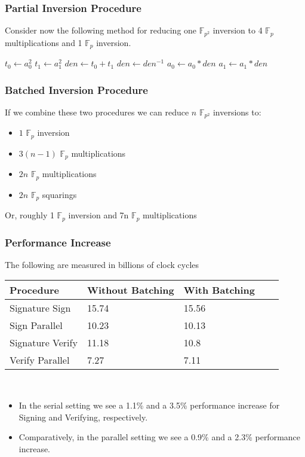 \documentclass{beamer}
\begin{document}
\begin{frame}[fragile]
\frametitle{Partial Inversion Procedure}
Consider now the following method for reducing one $\mathbb{F}_{p^{2}}$ inversion to 4 $\mathbb{F}_{p}$ multiplications and 1 $\mathbb{F}_{p}$ inversion.
\begin{center}
\begin{algorithm}[H]
\begin{algorithmic}[1]
	\State $t_0 \gets a_{0}^{2}$
	\State $t_1 \gets a_{1}^{2}$
	\State $den \gets t_0 + t_1$
	\State $den \gets den^{-1}$
	\State $a_{0} \gets a_{0} * den$
	\State $a_{1} \gets a_{1} * den$
\end{algorithmic}
\end{algorithm}
\end{center}
\end{frame}

\begin{frame}[fragile]
\frametitle{Batched Inversion Procedure}
If we combine these two procedures we can reduce $n$ $\mathbb{F}_{p^{2}}$ inversions to:
\begin{itemize}
\item $1$ $\mathbb{F}_{p}$ inversion
\item $3(n-1)$ $\mathbb{F}_{p}$ multiplications
\item $2n$ $\mathbb{F}_{p}$ multiplications
\item $2n$ $\mathbb{F}_{p}$ squarings
\end{itemize}
Or, roughly 1 $\mathbb{F}_{p}$ inversion and 7n $\mathbb{F}_{p}$ multiplications
\end{frame}

\begin{frame}[fragile]
\frametitle{Performance Increase}
The following are measured in billions of clock cycles
\begin{center}
\begin{tabular}{@{}lllll@{}}
	\toprule
	Procedure & Without Batching & With Batching\\
	\midrule
	Signature Sign & 15.74 & 15.56\\
	Sign Parallel & 10.23 & 10.13\\
	Signature Verify & 11.18 & 10.8\\
	Verify Parallel & 7.27 & 7.11\\
	\bottomrule
\end{tabular}\\
\end{center}
\begin{itemize}
\item In the serial setting we see a 1.1\% and a 3.5\% performance increase for Signing and Verifying, respectively.
\item Comparatively, in the parallel setting we see a 0.9\% and a 2.3\% performance increase.
\end{itemize}
\end{frame}
\end{document}
